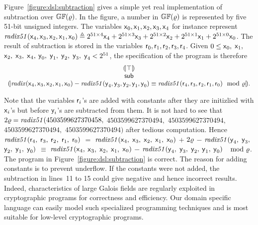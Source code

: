 Figure~\ref{figure:dsl:subtraction} gives a simple yet real
implementation of subtraction over $\mathbb{GF}(\varrho)$. 
In the figure, a number in $\mathbb{GF}(\varrho)$ 
is represented by five 51-bit unsigned integers. The variables
$\mbox{\textsf{x}}_0, \mbox{\textsf{x}}_1, \mbox{\textsf{x}}_2, \mbox{\textsf{x}}_3,
\mbox{\textsf{x}}_4$ for instance represent 
$\mathit{radix51}(\mbox{\textsf{x}}_4, \mbox{\textsf{x}}_3, \mbox{\textsf{x}}_2,
\mbox{\textsf{x}}_1, \mbox{\textsf{x}}_0) \triangleq
2^{51 \times 4} \mbox{\textsf{x}}_4 + 2^{51 \times 3} \mbox{\textsf{x}}_3 + 
2^{51 \times 2} \mbox{\textsf{x}}_2 + 2^{51 \times 1} \mbox{\textsf{x}}_1 + 
2^{51 \times 0} \mbox{\textsf{x}}_0$. The result of
subtraction is stored in the variables $\mbox{\textsf{r}}_0, \mbox{\textsf{r}}_1,
\mbox{\textsf{r}}_2, \mbox{\textsf{r}}_3, \mbox{\textsf{r}}_4$. 
Given $0 \leq \mbox{\textsf{x}}_0,$ $\mbox{\textsf{x}}_1,$ $\mbox{\textsf{x}}_2,$
$\mbox{\textsf{x}}_3,$ $\mbox{\textsf{x}}_4,$ $\mbox{\textsf{y}}_0,$ $\mbox{\textsf{y}}_1,$
$\mbox{\textsf{y}}_2,$ $\mbox{\textsf{y}}_3,$ $\mbox{\textsf{y}}_4 < 2^{51}$, 
the specification of the program is therefore
\[
\begin{array}{c}
{(\!|}{\top}{|\!)}\\
\mbox{\textsf{sub}}\\
{(\!|}{\mathit{radix}(\mbox{\textsf{x}}_4, \mbox{\textsf{x}}_3, \mbox{\textsf{x}}_2,
\mbox{\textsf{x}}_1, \mbox{\textsf{x}}_0) -
\mathit{radix51}(\mbox{\textsf{y}}_4, \mbox{\textsf{y}}_3, \mbox{\textsf{y}}_2,
\mbox{\textsf{y}}_1, \mbox{\textsf{y}}_0)
\equiv
\mathit{radix51}(\mbox{\textsf{r}}_4, \mbox{\textsf{r}}_3, \mbox{\textsf{r}}_2,
\mbox{\textsf{r}}_1, \mbox{\textsf{r}}_0)
\mod {\varrho}
}{|\!)}.
\end{array}
\]

Note that the variables $\mbox{\textsf{r}}_i$'s are added with constants
after they are initizlied with $\mbox{\textsf{x}}_i$'s but before
$\mbox{\textsf{y}}_i$'s are subtracted from them. It is not hard to see that
$2\varrho = \mathit{radix51} (4503599627370458,$ $4503599627370494,$
$4503599627370494,$ $4503599627370494,$ $4503599627370494)$
after tedious computation. Hence $\mathit{radix51}(\mbox{\textsf{r}}_4,$
$\mbox{\textsf{r}}_3,$ $\mbox{\textsf{r}}_2,$ $\mbox{\textsf{r}}_1,$ $\mbox{\textsf{r}}_0)$ $=$
$\mathit{radix51}(\mbox{\textsf{x}}_4,$ $\mbox{\textsf{x}}_3,$ $\mbox{\textsf{x}}_2,$
$\mbox{\textsf{x}}_1,$ $\mbox{\textsf{x}}_0)$ $+$ $2 \varrho $ $-$
$\mathit{radix51}(\mbox{\textsf{y}}_4,$ $\mbox{\textsf{y}}_3,$ $\mbox{\textsf{y}}_2,$
$\mbox{\textsf{y}}_1,$ $\mbox{\textsf{y}}_0)$ $\equiv $
$\mathit{radix51}(\mbox{\textsf{x}}_4,$ $\mbox{\textsf{x}}_3,$ $\mbox{\textsf{x}}_2,$
$\mbox{\textsf{x}}_1,$ $\mbox{\textsf{x}}_0)$ $-$
$\mathit{radix51}(\mbox{\textsf{y}}_4,$ $\mbox{\textsf{y}}_3,$ $\mbox{\textsf{y}}_2,$
$\mbox{\textsf{y}}_1,$ $\mbox{\textsf{y}}_0)$ $\mod {\varrho} $. The program in
Figure~\ref{figure:dsl:subtraction} is correct. The reason for
adding constants is to prevent underflow. If the constants were not
added, the subtraction in lines~11 to 15 could give negative and hence
incorrect results. Indeed, characteristics of large Galois fields are
regularly exploited in cryptographic programs for correctness and
efficiency. Our domain specific language can easily model such
specialized programming techniques and is most suitable for low-level
cryptographic programs.

